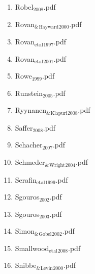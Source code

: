 \documentclass[11pt]{article}
\begin{document}
\begin{enumerate}
\begin{enumerate}
\item Robel$_{\text{2008}}$.pdf
\label{sec-1-1-1-1-11-19-17-130}

\item Rovan$_{\text{\&}}$$_{\text{Hayward}}$$_{\text{2000}}$.pdf
\label{sec-1-1-1-1-11-19-17-131}

\item Rovan$_{\text{et}}$$_{\text{al}}$$_{\text{1997}}$.pdf
\label{sec-1-1-1-1-11-19-17-132}

\item Rovan$_{\text{et}}$$_{\text{al}}$$_{\text{2001}}$.pdf
\label{sec-1-1-1-1-11-19-17-133}

\item Rowe$_{\text{1999}}$.pdf
\label{sec-1-1-1-1-11-19-17-134}

\item Runstein$_{\text{2005}}$.pdf
\label{sec-1-1-1-1-11-19-17-135}

\item Ryynanen$_{\text{\&}}$$_{\text{Klapuri}}$$_{\text{2008}}$.pdf
\label{sec-1-1-1-1-11-19-17-136}

\item Saffer$_{\text{2008}}$.pdf
\label{sec-1-1-1-1-11-19-17-137}

\item Schacher$_{\text{2007}}$.pdf
\label{sec-1-1-1-1-11-19-17-138}

\item Schmeder$_{\text{\&}}$$_{\text{Wright}}$$_{\text{2004}}$.pdf
\label{sec-1-1-1-1-11-19-17-139}

\item Serafin$_{\text{et}}$$_{\text{al}}$$_{\text{1999}}$.pdf
\label{sec-1-1-1-1-11-19-17-140}

\item Sgouros$_{\text{2002}}$.pdf
\label{sec-1-1-1-1-11-19-17-141}

\item Sgouros$_{\text{2003}}$.pdf
\label{sec-1-1-1-1-11-19-17-142}

\item Simon$_{\text{\&}}$$_{\text{Gobel}}$$_{\text{2002}}$.pdf
\label{sec-1-1-1-1-11-19-17-143}

\item Smallwood$_{\text{et}}$$_{\text{al}}$$_{\text{2008}}$.pdf
\label{sec-1-1-1-1-11-19-17-144}

\item Snibbe$_{\text{\&}}$$_{\text{Levin}}$$_{\text{2000}}$.pdf
\label{sec-1-1-1-1-11-19-17-145}


\end{enumerate}
\end{enumerate}
\end{document}
